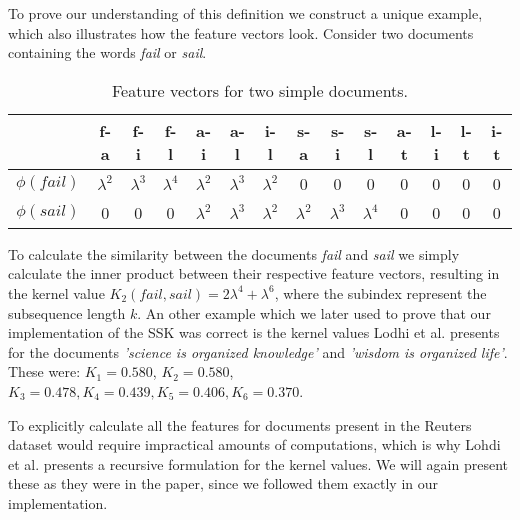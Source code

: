 To prove our understanding of this definition we construct a unique example, which also illustrates how the feature vectors look. Consider two documents containing the words \textit{fail} or \textit{sail}. 

\begin{table}[h]
	\centering
\begin{tabular}{|c|c|c|c|c|c|c|c|c|c|c|c|c|c|}
	\hline 
	& f-a & f-i & f-l & a-i & a-l & i-l & s-a & s-i & s-l & a-t & l-i & l-t & i-t \\ 
	\hline 
	$\phi(fail)$ & $ \lambda^2 $ & $ \lambda^3 $ &$ \lambda^4 $  &  $ \lambda^2 $& $ \lambda^3 $  & $ \lambda^2 $ & 0 & 0 & 0 & 0 & 0 & 0 & 0 \\ 
	\hline 
	$\phi(sail)$ & 0 & 0 & 0 & $\lambda^2$ & $\lambda^3$ & $\lambda^2$ & $\lambda^2$ & $\lambda^3$ & $\lambda^4$ & 0 & 0 & 0 & 0 \\ 
	\hline 
\end{tabular} 
\caption{Feature vectors for two simple documents.}
\end{table}

To calculate the similarity between the documents \textit{fail} and \textit{sail} we simply calculate the inner product between their respective feature vectors, resulting in the kernel value $ K_2(fail,sail)  = 2\lambda^4 + \lambda^6 $, where the subindex represent the subsequence length $ k $. An other example which we later used to prove that our implementation of the SSK was correct is the kernel values Lodhi et al. presents for the documents \textit{'science is organized knowledge'} and \textit{'wisdom is organized life'}. These were: $ K_1 = 0.580 $, $ K_2 = 0.580$, $ K_3 = 0.478, K_4=0.439, K_5 = 0.406, K_6 = 0.370 $.

To explicitly calculate all the features for documents present in the Reuters dataset would require impractical amounts of computations, which is why Lohdi et al. presents a recursive formulation for the kernel values. We will again present these as they were in the paper, since we followed them exactly in our implementation. 

